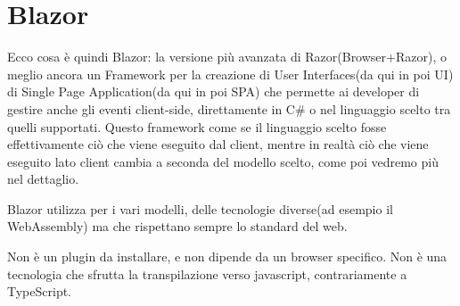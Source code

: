 \section{Blazor}
Ecco cosa \`e quindi Blazor: la versione pi\`u avanzata di Razor(Browser+Razor\cite{blazorWikiGitHub}), o meglio ancora un Framework per la creazione di User Interfaces(da qui in poi UI) di Single Page Application(da qui in poi SPA) che permette ai developer di gestire anche gli eventi client-side, direttamente in C\# o nel linguaggio scelto tra quelli supportati.
Questo framework come se il linguaggio scelto fosse effettivamente ci\`o che viene eseguito dal client, mentre in realt\`a ci\`o che viene eseguito lato client cambia a seconda del modello scelto, come poi vedremo pi\`u nel dettaglio.

Blazor utilizza per i vari modelli, delle tecnologie diverse(ad esempio il WebAssembly) ma che rispettano sempre lo standard del web.

Non \`e un plugin da installare, e non dipende da un browser specifico.
Non \`e una tecnologia che sfrutta la transpilazione verso javascript, contrariamente a TypeScript.